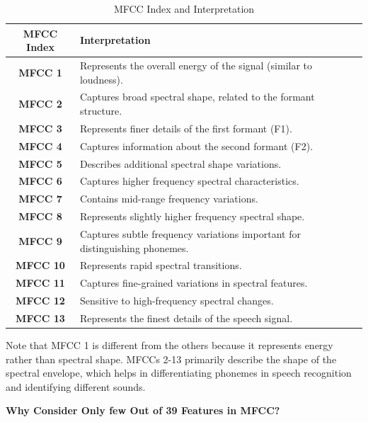 \documentclass[informe,english]{practicaitic}
\begin{document}
\begin{enumerate}
    \begin{table}[h!]
        \centering
        \begin{tabular}{|c|l|}
            \hline
            \textbf{MFCC Index} & \textbf{Interpretation} \\
            \hline
            \textbf{MFCC 1}  & Represents the overall energy of the signal (similar to loudness). \\
            \textbf{MFCC 2}  & Captures broad spectral shape, related to the formant structure. \\
            \textbf{MFCC 3}  & Represents finer details of the first formant (F1). \\
            \textbf{MFCC 4}  & Captures information about the second formant (F2). \\
            \textbf{MFCC 5}  & Describes additional spectral shape variations. \\
            \textbf{MFCC 6}  & Captures higher frequency spectral characteristics. \\
            \textbf{MFCC 7}  & Contains mid-range frequency variations. \\
            \textbf{MFCC 8}  & Represents slightly higher frequency spectral shape. \\
            \textbf{MFCC 9}  & Captures subtle frequency variations important for distinguishing phonemes. \\
            \textbf{MFCC 10} & Represents rapid spectral transitions. \\
            \textbf{MFCC 11} & Captures fine-grained variations in spectral features. \\
            \textbf{MFCC 12} & Sensitive to high-frequency spectral changes. \\
            \textbf{MFCC 13} & Represents the finest details of the speech signal. \\
            \hline
        \end{tabular}
        \caption{MFCC Index and Interpretation}
        \label{tab:mfcc}
    \end{table}
    
    Note that MFCC 1 is different from the others because it represents energy rather than spectral shape.
    MFCCs 2-13 primarily describe the shape of the spectral envelope, which helps in differentiating phonemes in speech recognition and identifying different sounds.
    
    \textbf{Why Consider Only few Out of 39 Features in MFCC?}
    

\end{enumerate}
\end{document}
